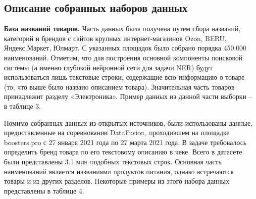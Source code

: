 \documentclass[12pt,a4paper]{article}
\begin{document}
\subsection{Описание собранных наборов данных}

\textbf{База названий товаров.} Часть данных была получена путем сбора названий, категорий и брендов с сайтов крупных интернет-магазинов Ozon, BERU, Яндекс.Маркет, Юлмарт. С указанных площадок было собрано порядка 450.000 наименований. Отметим, что для построения основной компоненты поисковой системы (а именно глубокой нейронной сети для задачи NER) будут использоваться лишь текстовые строки, содержащие всю информацию о товаре (то, что выше было названо описанием товара). Значительная часть товаров принадлежит разделу «Электроника». Пример данных из данной части выборки -- в таблице 3.

\begin{table}[H]
\begin{center}
    \caption{Примеры товаров с сайтов Ozon, BERU, Яндекс.Маркет, Юлмарт}
\end{center}
\end{table}


\noindent Помимо собранных данных из открытых источников, были использованы данные, предоставленные на соревновании DataFusion, проходившем на площадке boosters.pro с 27 января 2021 года по 27 марта 2021 года. В задаче требовалось определить бренд товара по его текстовому описанию в чеке. Всего в датасете были представлены 3.1 млн подобных текстовых строк. Основная часть наименований является названиями продуктов питания, однако встречаются товары и из других разделов. Некоторые примеры из этого набора данных представлены в таблице 4.
\end{document}
